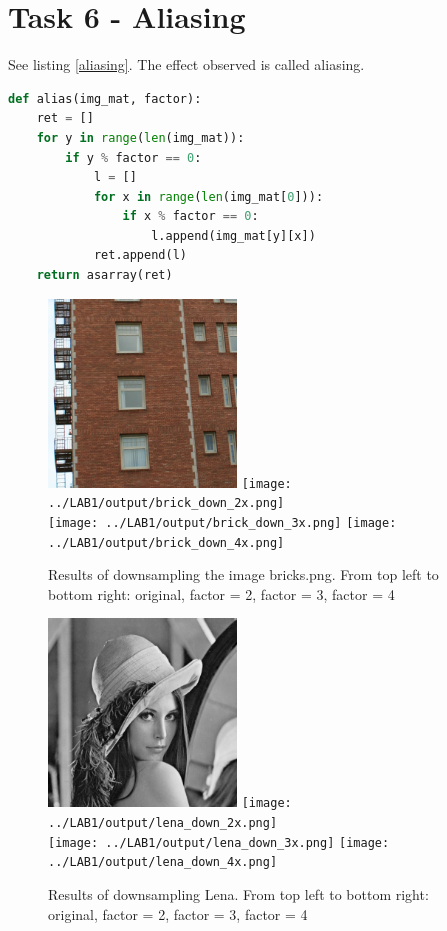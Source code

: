 \section*{Task 6 - Aliasing}

See listing \ref{aliasing}. The effect observed is called aliasing. 

\begin{lstlisting}[language=Python, label=aliasing, caption=Aliasing function]
def alias(img_mat, factor):
    ret = []
    for y in range(len(img_mat)):
        if y % factor == 0:
            l = []
            for x in range(len(img_mat[0])):
                if x % factor == 0:
                    l.append(img_mat[y][x])
            ret.append(l)
    return asarray(ret)
\end{lstlisting}

\begin{figure}[h!]
    \centering
    \includegraphics[width=5cm]{../LAB1/img/bricks.png}
    \texttt{[image: ../LAB1/output/brick\_down\_2x.png]} \\
    \texttt{[image: ../LAB1/output/brick\_down\_3x.png]}
    \texttt{[image: ../LAB1/output/brick\_down\_4x.png]}
    \caption{Results of downsampling the image bricks.png. From top left to bottom right: original, factor = 2, factor = 3, factor = 4}
\end{figure}


\begin{figure}[h!]
    \centering
    \includegraphics[width=5cm]{../LAB1/img/lena.png}
    \texttt{[image: ../LAB1/output/lena\_down\_2x.png]} \\
    \texttt{[image: ../LAB1/output/lena\_down\_3x.png]}
    \texttt{[image: ../LAB1/output/lena\_down\_4x.png]}
    \caption{Results of downsampling Lena. From top left to bottom right: original, factor = 2, factor = 3, factor = 4}
\end{figure}
